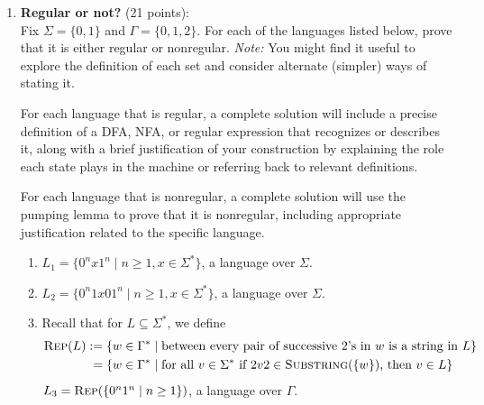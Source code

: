 \begin{enumerate} 


\item \textbf{Regular or not?} (21 points):\\
Fix $\Sigma = \{0,1\}$ and $\Gamma = \{0,1,2\}$.
For each of the languages listed below, 
prove that it is either regular or nonregular. {\it Note:} You might find it useful to 
explore the definition of each set and 
consider alternate (simpler) ways of stating it.

For each language that is regular, a complete 
solution will include a 
precise definition of a DFA, NFA, or regular 
expression that recognizes or describes it, along 
with a brief justification
of your construction by explaining the role each 
state plays in the machine
or referring back to relevant definitions.

For each language that is nonregular, a complete
solution will use the pumping lemma to prove that it is nonregular, 
including appropriate
justification related to the specific language.

\begin{enumerate}
    \item\gradeCorrectFirst $L_1 = \{0^n x 1^n \mid n \ge 1, x \in \Sigma^*\}$, a language over $\Sigma$.
    \item\gradeCorrect $L_2 = \{0^n 1 x 0 1^n \mid n 
    \ge 1, x \in \Sigma^* \}$, a language over 
    $\Sigma$.
    \item\gradeCorrect 
    Recall that for $L \subseteq \Sigma^*$, we define
    \begin{align*}
    \textsc{Rep}(L) &:= \{ w \in \Gamma^* \mid \text{between every pair of successive $2$'s in $w$ is a string in $L$}\}\\
    &\phantom{:}=\{w \in \Gamma^* \mid \text{for all } v \in \Sigma^* \text{ if } 2v2 \in \textsc{Substring}(\{w\})  \text{, then } v \in L\} 
    \end{align*}
    $L_3 = \textsc{Rep}( \{ 0^n 1^n \mid n \geq 1 \} )$, 
    a language over $\Gamma$.
\end{enumerate}




\end{enumerate}
